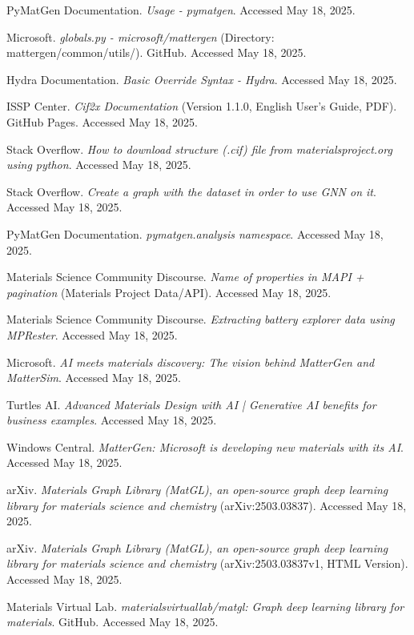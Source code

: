 \documentclass[letterpaper]{article} %
\begin{document}
\begin{thebibliography}{99}
 PyMatGen Documentation. \textit{Usage - pymatgen}. Accessed May 18, 2025.

 Microsoft. \textit{globals.py - microsoft/mattergen} (Directory: mattergen/common/utils/). GitHub. Accessed May 18, 2025.

 Hydra Documentation. \textit{Basic Override Syntax - Hydra}. Accessed May 18, 2025.

 ISSP Center. \textit{Cif2x Documentation} (Version 1.1.0, English User's Guide, PDF). GitHub Pages. Accessed May 18, 2025.

 Stack Overflow. \textit{How to download structure (.cif) file from materialsproject.org using python}. Accessed May 18, 2025.

 Stack Overflow. \textit{Create a graph with the dataset in order to use GNN on it}. Accessed May 18, 2025.

 PyMatGen Documentation. \textit{pymatgen.analysis namespace}. Accessed May 18, 2025.

 Materials Science Community Discourse. \textit{Name of properties in MAPI + pagination} (Materials Project Data/API). Accessed May 18, 2025.

 Materials Science Community Discourse. \textit{Extracting battery explorer data using MPRester}. Accessed May 18, 2025.

 Microsoft. \textit{AI meets materials discovery: The vision behind MatterGen and MatterSim}. Accessed May 18, 2025.

 Turtles AI. \textit{Advanced Materials Design with AI | Generative AI benefits for business examples}. Accessed May 18, 2025.

 Windows Central. \textit{MatterGen: Microsoft is developing new materials with its AI}. Accessed May 18, 2025.

 arXiv. \textit{Materials Graph Library (MatGL), an open-source graph deep learning library for materials science and chemistry} (arXiv:2503.03837). Accessed May 18, 2025.

 arXiv. \textit{Materials Graph Library (MatGL), an open-source graph deep learning library for materials science and chemistry} (arXiv:2503.03837v1, HTML Version). Accessed May 18, 2025.

 Materials Virtual Lab. \textit{materialsvirtuallab/matgl: Graph deep learning library for materials}. GitHub. Accessed May 18, 2025.


\end{thebibliography}
\end{document}
